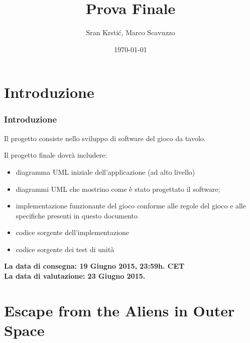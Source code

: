 \documentclass{beamer}
\title[Prova Finale]{Prova Finale} %
\author{Sr\dj{}an Krsti\'c, Marco Scavuzzo} %
\institute[] %
{
Politecnico di Milano \\ %
\medskip
\textit{srdan.krstic@polimi.it, marco.scavuzzo@polimi.it} %
}
\date{\today} %
\begin{document}
\begin{frame}
\titlepage %
\end{frame}





\section{Introduzione}
\begin{frame}
\frametitle{Introduzione}
Il progetto consiste nello sviluppo di software del gioco da tavolo.

Il progetto finale dovr\` a includere:
\begin{itemize}
\item diagramma UML iniziale dell'applicazione  (ad alto livello)
\item diagrammi UML che mostrino come \`e stato progettato il software;
\item implementazione funzionante del gioco conforme alle regole del gioco e alle specifiche presenti in questo documento
\item codice sorgente dell'implementazione
\item codice sorgente dei test di unit\`a
\end{itemize}
\textbf{La data di consegna: 19 Giugno 2015, 23:59h. CET}\\
\textbf{La data di valutazione: 23 Giugno 2015.}
\end{frame}


{
%
\section{Escape from the Aliens in Outer Space}
\begin{frame}[plain]


\end{frame}
}
\end{document}
